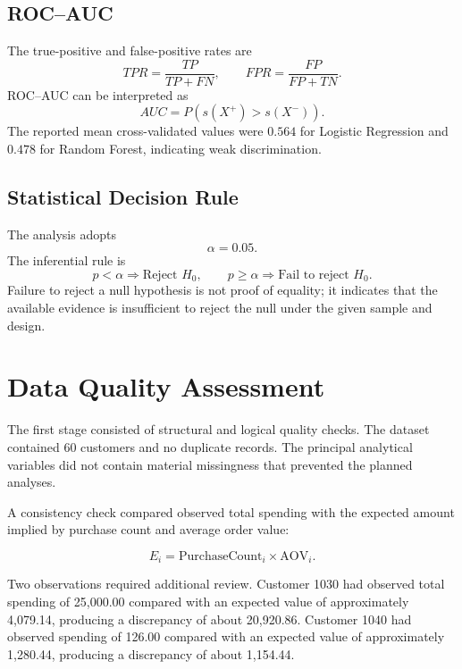 \documentclass[11pt,a4paper]{article}
\begin{document}
\subsection{ROC--AUC}

The true-positive and false-positive rates are
\begin{equation}
TPR=\frac{TP}{TP+FN},
\qquad
FPR=\frac{FP}{FP+TN}.
\end{equation}
ROC--AUC can be interpreted as
\begin{equation}
AUC=P(s(X^+)>s(X^-)).
\end{equation}
The reported mean cross-validated values were $0.564$ for Logistic
Regression and $0.478$ for Random Forest, indicating weak discrimination.

\subsection{Statistical Decision Rule}

The analysis adopts
\begin{equation}
\alpha=0.05.
\end{equation}
The inferential rule is
\begin{equation}
p<\alpha\Rightarrow\text{Reject }H_0,
\qquad
p\geq\alpha\Rightarrow\text{Fail to reject }H_0.
\end{equation}
Failure to reject a null hypothesis is not proof of equality; it indicates
that the available evidence is insufficient to reject the null under the
given sample and design.


\section{Data Quality Assessment}




The first stage consisted of structural and logical quality checks.
The dataset contained 60 customers and no duplicate records. The principal
analytical variables did not contain material missingness that prevented
the planned analyses.

A consistency check compared observed total spending with the expected
amount implied by purchase count and average order value:

\begin{equation}
E_i = \text{PurchaseCount}_i \times \text{AOV}_i.
\end{equation}

Two observations required additional review. Customer 1030 had observed
total spending of 25,000.00 compared with an expected value of approximately
4,079.14, producing a discrepancy of about 20,920.86. Customer 1040 had
observed spending of 126.00 compared with an expected value of approximately
1,280.44, producing a discrepancy of about 1,154.44.
\end{document}
